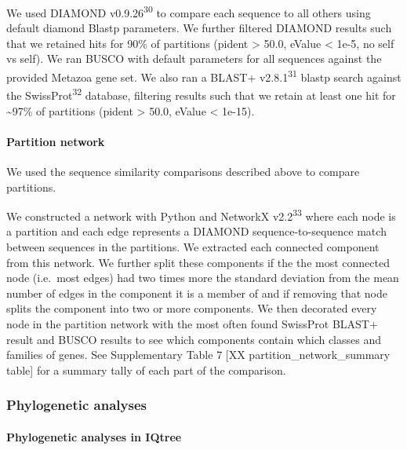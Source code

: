\documentclass[]{article}
\let\oldparagraph\paragraph
\renewcommand{\paragraph}[1]{\oldparagraph{#1}\mbox{}}
\begin{document}
We used DIAMOND v0.9.26\textsuperscript{30} to compare each sequence to
all others using default diamond Blastp parameters. We further filtered
DIAMOND results such that we retained hits for 90\% of partitions
(pident \textgreater{} 50.0, eValue \textless{} 1e-5, no self vs self).
We ran BUSCO with default parameters for all sequences against the
provided Metazoa gene set. We also ran a BLAST+
v2.8.1\textsuperscript{31} blastp search against the
SwissProt\textsuperscript{32} database, filtering results such that we
retain at least one hit for \textasciitilde{}97\% of partitions (pident
\textgreater{} 50.0, eValue \textless{} 1e-15).

\hypertarget{partition-network}{%
\paragraph{Partition network}\label{partition-network}}

We used the sequence similarity comparisons described above to compare
partitions.

We constructed a network with Python and NetworkX
v2.2\textsuperscript{33} where each node is a partition and each edge
represents a DIAMOND sequence-to-sequence match between sequences in the
partitions. We extracted each connected component from this network. We
further split these components if the the most connected node (i.e.~most
edges) had two times more the standard deviation from the mean number of
edges in the component it is a member of and if removing that node
splits the component into two or more components. We then decorated
every node in the partition network with the most often found SwissProt
BLAST+ result and BUSCO results to see which components contain which
classes and families of genes. See Supplementary Table 7 {[}XX
partition\_network\_summary table{]} for a summary tally of each part of
the comparison.

\hypertarget{phylogenetic-analyses}{%
\subsubsection{Phylogenetic analyses}\label{phylogenetic-analyses}}

\hypertarget{phylogenetic-analyses-in-iqtree}{%
\paragraph{Phylogenetic analyses in
IQtree}\label{phylogenetic-analyses-in-iqtree}}
\end{document}
